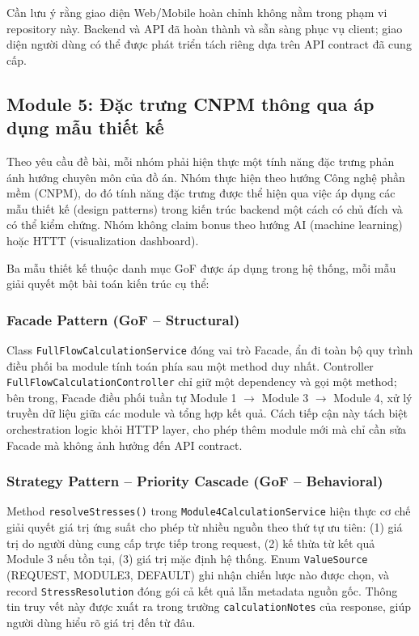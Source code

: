 \documentclass[a4paper]{article}
\begin{document}
Cần lưu ý rằng giao diện Web/Mobile hoàn chỉnh không nằm trong phạm vi repository này. Backend và API đã hoàn thành và sẵn sàng phục vụ client; giao diện người dùng có thể được phát triển tách riêng dựa trên API contract đã cung cấp.

\subsection{Module 5: Đặc trưng CNPM thông qua áp dụng mẫu thiết kế}

Theo yêu cầu đề bài, mỗi nhóm phải hiện thực một tính năng đặc trưng phản ánh hướng chuyên môn của đồ án. Nhóm thực hiện theo hướng Công nghệ phần mềm (CNPM), do đó tính năng đặc trưng được thể hiện qua việc áp dụng các mẫu thiết kế (design patterns) trong kiến trúc backend một cách có chủ đích và có thể kiểm chứng. Nhóm không claim bonus theo hướng AI (machine learning) hoặc HTTT (visualization dashboard).

Ba mẫu thiết kế thuộc danh mục GoF được áp dụng trong hệ thống, mỗi mẫu giải quyết một bài toán kiến trúc cụ thể:

\subsubsection{Facade Pattern (GoF -- Structural)}

Class \texttt{FullFlowCalculationService} đóng vai trò Facade, ẩn đi toàn bộ quy trình điều phối ba module tính toán phía sau một method duy nhất. Controller \texttt{FullFlowCalculationController} chỉ giữ một dependency và gọi một method; bên trong, Facade điều phối tuần tự Module 1 $\rightarrow$ Module 3 $\rightarrow$ Module 4, xử lý truyền dữ liệu giữa các module và tổng hợp kết quả. Cách tiếp cận này tách biệt orchestration logic khỏi HTTP layer, cho phép thêm module mới mà chỉ cần sửa Facade mà không ảnh hưởng đến API contract.

\subsubsection{Strategy Pattern -- Priority Cascade (GoF -- Behavioral)}

Method \texttt{resolveStresses()} trong \texttt{Module4CalculationService} hiện thực cơ chế giải quyết giá trị ứng suất cho phép từ nhiều nguồn theo thứ tự ưu tiên: (1) giá trị do người dùng cung cấp trực tiếp trong request, (2) kế thừa từ kết quả Module 3 nếu tồn tại, (3) giá trị mặc định hệ thống. Enum \texttt{ValueSource} (REQUEST, MODULE3, DEFAULT) ghi nhận chiến lược nào được chọn, và record \texttt{StressResolution} đóng gói cả kết quả lẫn metadata nguồn gốc. Thông tin truy vết này được xuất ra trong trường \texttt{calculationNotes} của response, giúp người dùng hiểu rõ giá trị đến từ đâu.
\end{document}
